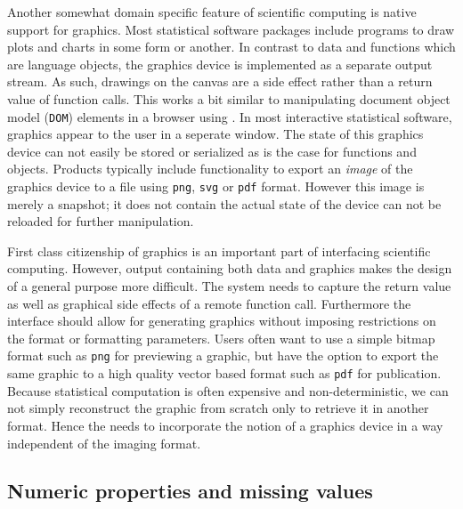 Another somewhat domain specific feature of scientific computing is native support for graphics. Most statistical software packages include programs to draw plots and charts in some form or another. In contrast to data and functions which are language objects, the graphics device is implemented as a separate output stream. As such, drawings on the canvas are a side effect rather than a return value of function calls. This works a bit similar to manipulating document object model (\texttt{DOM}) elements in a browser using \JavaScript. In most interactive statistical software, graphics appear to the user in a seperate window. The state of this graphics device can not easily be stored or serialized as is the case for functions and objects. Products typically include functionality to export an \emph{image} of the graphics device to a file using \texttt{png}, \texttt{svg} or \texttt{pdf} format. However this image is merely a snapshot; it does not contain the actual state of the device can not be reloaded for further manipulation.

First class citizenship of graphics is an important part of interfacing scientific computing. However, output containing both data and graphics makes the design of a general purpose \API more difficult. The system needs to capture the return value as well as graphical side effects of a remote function call. Furthermore the interface should allow for generating graphics without imposing restrictions on the format or formatting parameters. Users often want to use a simple bitmap format such as \texttt{png} for previewing a graphic, but have the option to export the same graphic to a high quality vector based format such as \texttt{pdf} for publication. Because statistical computation is often expensive and non-deterministic, we can not simply reconstruct the graphic from scratch only to retrieve it in another format. Hence the \API needs to incorporate the notion of a graphics device in a way independent of the imaging format. 

\subsection{Numeric properties and missing values}


